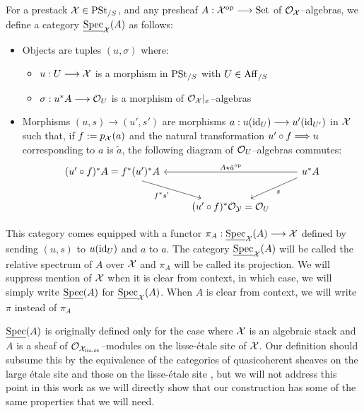\documentclass[11pt]{amsart}
\begin{document}
\begin{defn}
\label{defn:rel-spec}
For a prestack $\mathcal{X} \in \mathrm{PSt}_{/S}$, and any presheaf $A : \mcX^\op \to \Set$ of
$\mathcal{O}_\mathcal{X}$--algebras, we define a category $\underline{\mathrm{Spec}}_\mathcal{X}(A)$ as follows:
\begin{itemize}
\item Objects are tuples $(u, \sigma)$ where:
  \begin{itemize}
  \item $u : U \to \mcX$ is a morphism in $\mathrm{PSt}_{/S}$ with $U \in \mathrm{Aff}_{/S}$
  \item $\sigma : u^*A \to \mcO_U$ is a morphism of
    $\mathcal{O}_\mathcal{X}|_x$--algebras
  \end{itemize}
\item Morphisms $(u, s) \to (u', s')$ are morphisms
  $a : u(\id_U) \to u'(\id_{U'})$ in $\mathcal{X}$
  such that, if $f := p_\mathcal{X}(a)$ and the natural transformation
  $u' \circ f \To u$ corresponding to $a$ is $\tilde{a}$, the following diagram
  of $\mathcal{O}_U$--algebras commutes:
  \[\begin{tikzcd}
  (u' \circ f)^*A = f^*(u')^*A
    \ar[from=rr, "A \star \tilde{a}^\op" above]
    \ar[rd, "f^*s'" below left] & &
  u^*A \ar[ld, "s" below right] \\ &
  (u' \circ f)^*\mcO_\mcY = \mcO_U &
  \end{tikzcd}\]
\end{itemize}
This category comes equipped with a functor
$\pi_A : \ul\Spec_\mcX(A) \to \mcX$ defined by sending $(u, s)$ to $u(\mathrm{id}_U)$
and $a$ to $a$.
The category $\underline{\mathrm{Spec}}_\mathcal{X}(A)$ will be called the relative
spectrum of $A$ over $\mathcal{X}$ and $\pi_A$ will be called its projection.
We will suppress mention of $\mathcal{X}$ when it is clear from context, in which
case, we will simply write $\underline{\mathrm{Spec}}(A)$ for $\underline{\mathrm{Spec}}_\mathcal{X}(A)$.
When $A$ is clear from context, we will write $\pi$ instead of $\pi_A$
\end{defn}

\begin{warn}
$\underline{\mathrm{Spec}}(A)$ is originally defined only for the case where $\mathcal{X}$ is an
algebraic stack and $A$ is a sheaf of $\mathcal{O}_{\mathcal{X}_{\text{lis-\'et}}}$--modules
on the lisse-\'etale site of $\mathcal{X}$. Our definition should subsume this
by the equivalence of the categories of quasicoherent sheaves on the large
\'etale site and those on the lisse-\'etale site
\cite[\href{https://stacks.math.columbia.edu/tag/07B1}{Lemma 07B1}]
{stacks-project}, but we will not address this point in this work as
we will directly show that our construction has some of the same properties
that we will need.
\end{warn}
\end{document}
